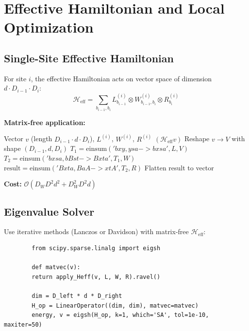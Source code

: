 \documentclass[aps,prb,onecolumn,scriptaddress]{revtex4-2}
\begin{document}
	\section{Effective Hamiltonian and Local Optimization}
	
	\subsection{Single-Site Effective Hamiltonian}
	
	For site $i$, the effective Hamiltonian acts on vector space of dimension $d \cdot D_{i-1} \cdot D_i$:
	\begin{equation}
		\mathcal{H}_{\text{eff}} = \sum_{b_{i-1}, b_i} L^{(i)}_{b_{i-1}} \otimes W^{(i)}_{b_{i-1}, b_i} \otimes R^{(i)}_{b_i}
	\end{equation}
	
	\textbf{Matrix-free application:}
	
	\begin{algorithm}[H]
		\caption{ApplyHeff (Single-Site)}
		\begin{algorithmic}[1]
			\Require Vector $v$ (length $D_{i-1} \cdot d \cdot D_i$), $L^{(i)}$, $W^{(i)}$, $R^{(i)}$
			\Ensure $(\mathcal{H}_{\text{eff}} v)$
			\State Reshape $v \to V$ with shape $(D_{i-1}, d, D_i)$
			\State {}
			\State $T_1 = \text{einsum}('bxy,ysa->bxsa', L, V)$
			\State {}
			\State $T_2 = \text{einsum}('bxsa,bBst->Bxta', T_1, W)$
			\State {}
			\State $\text{result} = \text{einsum}('Bxta,BaA->xtA', T_2, R)$
			\State \Return Flatten result to vector
		\end{algorithmic}
	\end{algorithm}
	
	\textbf{Cost:} $\mathcal{O}(D_W D^2 d^2 + D_W^2 D^2 d)$
	
	\subsection{Eigenvalue Solver}
	
	Use iterative methods (Lanczos or Davidson) with matrix-free $\mathcal{H}_{\text{eff}}$:
	
	\begin{verbatim}
		from scipy.sparse.linalg import eigsh
		
		def matvec(v):
		return apply_Heff(v, L, W, R).ravel()
		
		dim = D_left * d * D_right
		H_op = LinearOperator((dim, dim), matvec=matvec)
		energy, v = eigsh(H_op, k=1, which='SA', tol=1e-10, maxiter=50)
	\end{verbatim}
	
\end{document}
